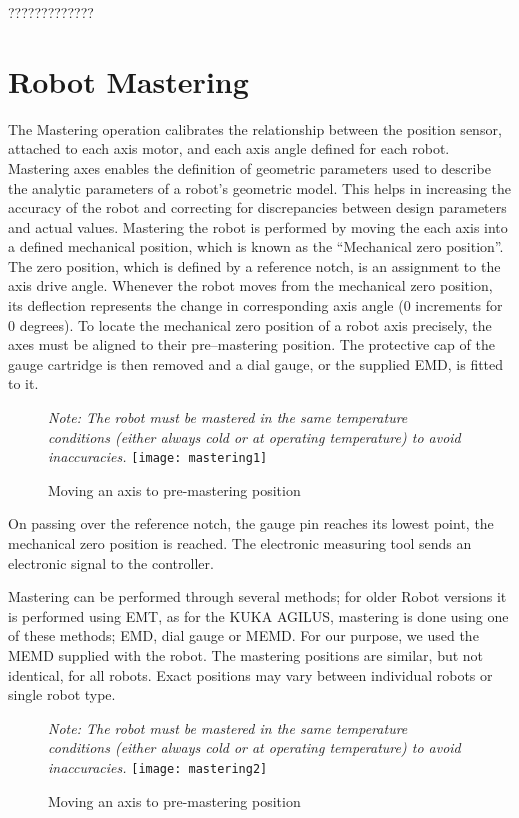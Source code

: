 
	?????????????
	\section{Robot Mastering}
	
	The Mastering operation calibrates the relationship between the position sensor, attached to each axis motor, and each axis angle defined for each robot. Mastering axes enables the definition of geometric parameters used to describe the analytic parameters of a robot’s geometric model. This helps in increasing the accuracy of the robot and correcting for discrepancies between design parameters and actual values.
	\newline
	Mastering the robot is performed by moving the each axis into a defined mechanical position, which is known as the “Mechanical zero position”. The zero position, which is defined by a reference notch, is an assignment to the axis drive angle. Whenever the robot moves from the mechanical zero position, its deflection represents the change in corresponding axis angle (0 increments for 0 degrees).
	\newline
	To locate the mechanical zero position of a robot axis precisely, the axes must be aligned to their pre–mastering position. The protective cap of the gauge cartridge is then removed and a dial gauge, or the supplied EMD, is fitted to it. 
	\begin{figure}[H]
        \centering
                    \textit{Note: The robot must be mastered in the same temperature conditions (either always cold or at operating temperature) to avoid inaccuracies.}
		\texttt{[image: mastering1]}
        		\caption{Moving an axis to pre-mastering position}
    \end{figure}
    
	On passing over the reference notch, the gauge pin reaches its lowest point, the mechanical zero position is reached. The electronic measuring tool sends an electronic signal to the controller.
	
	Mastering can be performed through several methods; for older Robot versions it is performed using EMT, as for the KUKA AGILUS, mastering is done using one of these methods; EMD, dial gauge or MEMD. For our purpose, we used the MEMD supplied with the robot. The mastering positions are similar, but not identical, for all robots. Exact positions may vary between individual robots or single robot type. 
	\begin{figure}[H]
        \centering
        \textit{Note: The robot must be mastered in the same temperature conditions (either always cold or at operating temperature) to avoid inaccuracies.}
		\texttt{[image: mastering2]}
		\caption{Moving an axis to pre-mastering position}
    \end{figure}
	
